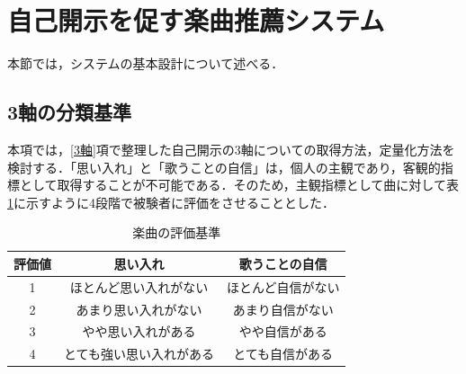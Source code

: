 \section{自己開示を促す楽曲推薦システム}
本節では，システムの基本設計について述べる．

\subsection{3軸の分類基準}

本項では，\ref{3軸}項で整理した自己開示の3軸についての取得方法，定量化方法を検討する．「思い入れ」と「歌うことの自信」は，個人の主観であり，客観的指標として取得することが不可能である．そのため，主観指標として曲に対して表\ref{tab:evaluation_criteria}に示すように4段階で被験者に評価をさせることとした．

\begin{table}[htbp]
\centering
\caption{楽曲の評価基準}
\label{tab:evaluation_criteria}
\begin{tabular}{|c|c|c|}
\hline
評価値 & 思い入れ & 歌うことの自信 \\
\hline
1 & ほとんど思い入れがない & ほとんど自信がない \\
2 & あまり思い入れがない & あまり自信がない \\
3 & やや思い入れがある & やや自信がある \\
4 & とても強い思い入れがある & とても自信がある \\
\hline
\end{tabular}
\end{table}

